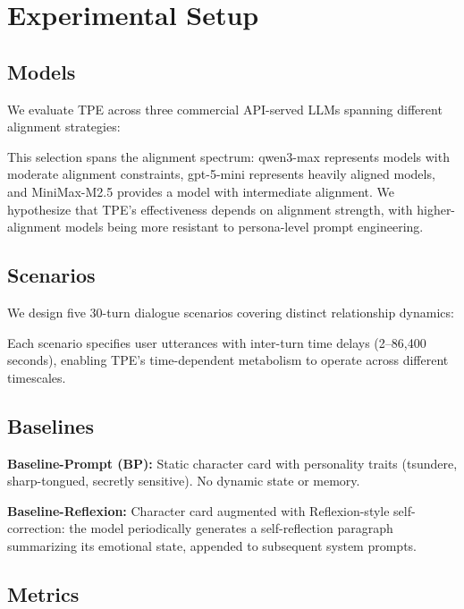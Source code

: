 \section{Experimental Setup}

\subsection{Models}

We evaluate TPE across three commercial API-served LLMs spanning different alignment strategies:



This selection spans the alignment spectrum: qwen3-max represents models with moderate alignment constraints, gpt-5-mini represents heavily aligned models, and MiniMax-M2.5 provides a model with intermediate alignment. We hypothesize that TPE's effectiveness depends on alignment strength, with higher-alignment models being more resistant to persona-level prompt engineering.

\subsection{Scenarios}

We design five 30-turn dialogue scenarios covering distinct relationship dynamics:



Each scenario specifies user utterances with inter-turn time delays (2--86,400 seconds), enabling TPE's time-dependent metabolism to operate across different timescales.

\subsection{Baselines}

\textbf{Baseline-Prompt (BP):} Static character card with personality traits (tsundere, sharp-tongued, secretly sensitive). No dynamic state or memory.

\textbf{Baseline-Reflexion:} Character card augmented with Reflexion-style self-correction: the model periodically generates a self-reflection paragraph summarizing its emotional state, appended to subsequent system prompts.

\subsection{Metrics}

